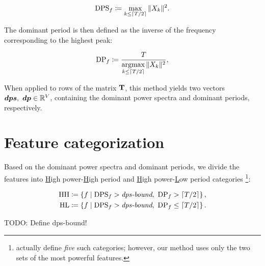 \begin{equation}
	\text{DPS}_{f} \coloneqq \max\limits_{k \leq \lceil T / 2\rceil}{\|X_{k}\|^{2}}.
\end{equation}

The dominant period is then defined as the inverse of the frequency corresponding to the highest peak:

\begin{equation}
	\text{DP}_{f} \coloneqq \frac{T}{\operatorname*{argmax}\limits_{k \leq \lceil T / 2\rceil}{\|X_{k}\|^{2}}},
\end{equation}

When applied to rows of the matrix $\mathbf{T}$, this method yields two vectors $\vect{DPS},\ \vect{DP} \in \R^{\featcount}$, containing the dominant power spectra and dominant periods, respectively.


\section{Feature categorization}
Based on the dominant power spectra and dominant periods, we divide the features into \underline{H}igh power-\underline{H}igh period and \underline{H}igh power-\underline{L}ow period categories \footnote{\cite{event-detection} actually define \textit{five} such categories; however, our method uses only the two sets of the most powerful features.}:

\begin{equation}
\begin{split}
	\text{HH} \coloneqq \left\{ f \mid \text{DPS}_{f} > \textit{dps-bound},\ \text{DP}_{f} > \lceil T / 2\rceil \right\}, \\
	\text{HL} \coloneqq \left\{ f \mid \text{DPS}_{f} > \textit{dps-bound},\ \text{DP}_{f} \leq \lceil T / 2\rceil \right\}.
\end{split}
\end{equation}

{\color{red}TODO: Define dps-bound!}